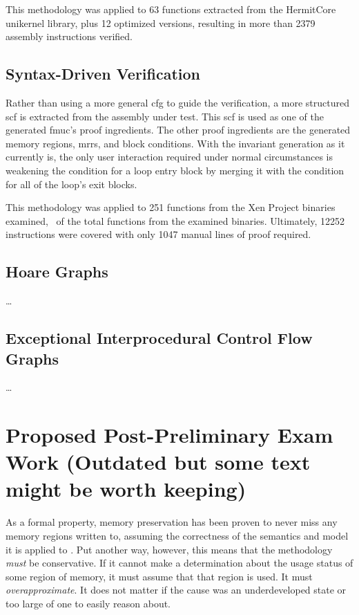 This methodology was applied to \num{63} functions
extracted from the HermitCore unikernel library, plus \num{12} optimized versions,
resulting in more than \num{2379} assembly instructions verified.

\subsection{Syntax-Driven Verification}
Rather than using a more general \ac{cfg} to guide the verification,
a more structured \ac{scf} is extracted from the assembly under test.
This \ac{scf} is used as one of the generated \ac{fmuc}'s proof ingredients.
The other proof ingredients are the generated memory regions,
\acp{mrr}, and block conditions.
With the invariant generation as it currently is,
the only user interaction required under normal circumstances
is weakening the condition for a loop entry block
by merging it with the condition for all of the loop's exit blocks.

This methodology was applied to 251 functions from the Xen Project binaries examined,
\xenpercentage\ of the total functions from the examined binaries.
Ultimately, \num{12252} instructions were covered
with only \num{1047} manual lines of proof required.

\subsection{Hoare Graphs}
\todo\dots

\subsection{Exceptional Interprocedural Control Flow Graphs}
\todo\dots

\section{Proposed Post-Preliminary Exam Work (Outdated but some text might be worth keeping)}
As a formal property, memory preservation
has been proven to never miss any memory regions written to,
assuming the correctness of the semantics and model it is applied
to \autocite{bockenek2019preservation,popl2019underreview}.
Put another way, however, this means that the methodology \emph{must} be conservative.
If it cannot make a determination about the usage status of some region of memory,
it must assume that that region is used. It must \emph{overapproximate}.%
It does not matter if the cause was an underdeveloped state
or too large of one to easily reason about.

